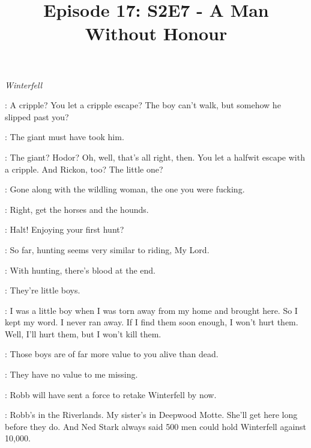 

\title{Episode 17: S2E7 - A Man Without Honour}
\author{}
\date{}
\maketitle




\scene

\textit{Winterfell}


\THEON: A cripple? You let a cripple escape? The boy can't walk, but somehow he slipped past you?

\LORREN: The giant must have took him.

\THEON: The giant? Hodor? Oh, well, that's all right, then. You let a halfwit escape with a cripple. And Rickon, too? The little one?

\LORREN: Gone along with the wildling woman, the one you were fucking.


\THEON:  Right, get the horses and the hounds.


\THEON: Halt! Enjoying your first hunt?

\LUWIN: So far, hunting seems very similar to riding, My Lord.

\THEON: With hunting, there's blood at the end.

\LUWIN: They're little boys.

\THEON: I was a little boy when I was torn away from my home and brought here. So I kept my word. I never ran away. If I find them soon enough, I won't hurt them. Well, I'll hurt them, but I won't kill them.

\LUWIN: Those boys are of far more value to you alive than dead.

\THEON: They have no value to me missing.

\LUWIN: Robb will have sent a force to retake Winterfell by now.

\THEON: Robb's in the Riverlands. My sister's in Deepwood Motte. She'll get here long before they do. And Ned Stark always said 500 men could hold Winterfell against 10,000.

